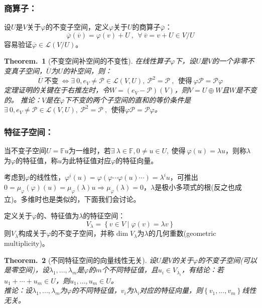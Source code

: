 \documentclass[zihao=5,UTF8]{report}
\theoremstyle{mystyle} %
\newtheorem{theorem}{Theorem.\,}
\begin{document}
\subsubsection{商算子：}
设$U$是$V$关于$\varphi$的不变子空间，定义$\varphi$关于$U$的商算子$\overline{\varphi}$：
\begin{equation*}
    \overline{\varphi}(\overline{v}) =  \varphi(v) + U\ ,\ \ \forall\ \overline{v} = v + U \in V/U
\end{equation*}
容易验证$\overline{\varphi} \in \mathscr{L}(V/U)$。

\begin{theorem}[不变空间补空间的不变性]
在线性算子$\varphi$下，设$U$是$V$的一个非零不变真子空间，$\overline{U}$为$U$的补空间，则：
\begin{equation*}
    \overline{U} \ \text{不变}\ \Longleftrightarrow \exists \ 0,e_V \ne \mathscr{P} \in \mathscr{L}(V,U),\  \mathscr{P}^2 = \mathscr{P}\ ,\ \ \text{使得}\  \varphi \mathscr{P} = \mathscr{P} \varphi 
\end{equation*}
{\color{gray}\small 定理证明的关键在于右推左时，令$W = (e_V - \mathscr{P})(V) $，则$V = U \oplus W$且$W$是不变的。
推论：$V$是在$\varphi$下不变的两个子空间的直和的等价条件是$\exists \ 0,e_V \ne \mathscr{P} \in \mathscr{L}(V,U),\  \mathscr{P}^2 = \mathscr{P}\ ,\ \ \text{使得}  \varphi \mathscr{P} = \mathscr{P} \varphi$。}
\end{theorem}
\subsubsection{特征子空间：}
当不变子空间$U = \mathbb{F}u$为一维时，若$\exists \ \lambda \in \mathbb{F},0 \ne u \in U,\ \text{使得}\ \varphi(u) = \lambda u$，则称$\lambda$为$\varphi$的特征值，称$u$为此特征值对应$\varphi$的特征向量。\par
考虑到$\varphi$的线性性，$\varphi^i(u) = \varphi(\varphi\cdots \varphi(u)\cdots ) = \lambda^i u$，可推出$0 = \mu_{\varphi}(\varphi)(u) = \mu_{\varphi}(\lambda)u \Longrightarrow \mu_{\varphi}(\lambda) = 0$，$\lambda$是极小多项式的根(反之也成立)。{\color{gray}\small 多维时也是类似的，下面我们会讨论。}\par
定义关于$\varphi$的、特征值为$\lambda$的特征空间：
\begin{equation*}
    V_{\lambda} = \left\{v\in V \mid \varphi(v) = \lambda v \right\}
\end{equation*}
则$V_{\lambda}$构成关于$\varphi$的不变子空间，并称$\dim V_{\lambda}$为$\lambda$的几何重数(geometric multiplicity)。
\begin{theorem}[不同特征空间的向量线性无关]\label{不同特征空间的向量线性无关}
    设$U$是$V$的关于$\varphi$的不变子空间(可以是零空间)，设$\lambda_1,...,\lambda_m$是$\varphi$的$m$个不同特征值，且$u_i \in V_{\lambda_i}$，有结论：若$u_1 + \cdots + u_m \in U$，则$u_1,...,u_m \in U$。\\
    推论：设$\lambda_1,...,\lambda_m$为$\varphi$的不同特征值，$v_i$为$\lambda_i$对应的特征向量，则$\left\{v_1,...,v_m \right\}$线性无关。
\end{theorem}
\end{document}
